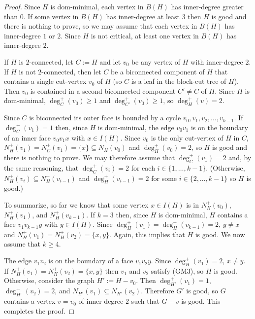 \documentclass[12pt]{article}
\begin{document}
\begin{proof}
  Since $H$ is dom-minimal, each vertex in $B(H)$ has inner-degree greater than $0$.  If some vertex in $B(H)$ has inner-degree at least $3$ then $H$ is good and there is nothing to prove, so we may assume that each vertex in $B(H)$ has inner-degree $1$ or $2$.  Since $H$ is not critical, at least one vertex in $B(H)$ has inner-degree $2$.

  If $H$ is $2$-connected, let $C:=H$ and let $v_0$ be any vertex of $H$ with inner-degree $2$.
  If $H$ is not $2$-connected, then let $C$ be a biconnected component of $H$ that contains a single cut-vertex $v_0$ of $H$ (so $C$ is a leaf in the block-cut tree of $H$). Then $v_0$ is contained in a second biconnected component $C'\neq C$ of $H$. Since $H$ is dom-minimal, $\deg^+_{C}(v_0)\ge 1$ and $\deg^+_{C'}(v_0)\ge 1$, so $\deg^+_H(v)= 2$.

  Since $C$ is biconnected its outer face is bounded by a cycle $v_0,v_1,v_2,\ldots,v_{k-1}$.  If $\deg^+_C(v_1)=1$ then, since $H$ is dom-minimal, the edge $v_0v_1$ is on the boundary of an inner face $v_0v_1x$ with $x\in I(H)$.  Since $v_0$ is the only cut-vertex of $H$ in $C$, $N^+_H(v_1)=N^+_C(v_1)=\{x\}\subseteq N_H(v_0)$ and $\deg^+_H(v_0)=2$, so $H$ is good and there is nothing to prove.  We may therefore  assume that $\deg^+_C(v_1)=2$ and,  by the same reasoning, that $\deg^+_C(v_i)=2$ for each $i\in\{1,\ldots,k-1\}$.  (Otherwise, $N^+_H(v_i)\subseteq N^+_H(v_{i-1})$ and $\deg^+_H(v_{i-1})=2$ for some $i\in\{2,\ldots,k-1\}$ so $H$ is good.)

  To summarize, so far we know that some vertex $x\in I(H)$ is in $N^+_H(v_0)$, $N^+_H(v_1)$, and $N^+_H(v_{k-1})$.  If $k=3$ then, since $H$ is dom-minimal, $H$ contains a face $v_1v_{k-1}y$ with $y\in I(H)$.  Since $\deg^+_H(v_1)=\deg^+_H(v_{k-1})=2$, $y\neq x$ and $N^+_H(v_1)=N^+_H(v_2)=\{x,y\}$. Again, this implies that $H$ is good.  We now assume that $k\ge 4$.

  The edge $v_1v_2$ is on the boundary of a face $v_1v_2y$.  Since $\deg^+_H(v_1)=2$, $x\neq y$.  If $N^+_H(v_1)=N^+_H(v_2)=\{x,y\}$ then $v_1$ and $v_2$ satisfy (GM3), so $H$ is good.  Otherwise, consider the graph $H':=H-v_0$.  Then $\deg^+_{H'}(v_1)=1$, $\deg^+_{H'}(v_2)=2$, and $N_{H'}(v_1)\subseteq N_{H'}(v_2)$.   Therefore $G'$ is good, so $G$ contains a vertex $v=v_0$ of inner-degree $2$ such that $G-v$ is good.  This completes the proof.
\end{proof}
\end{document}
